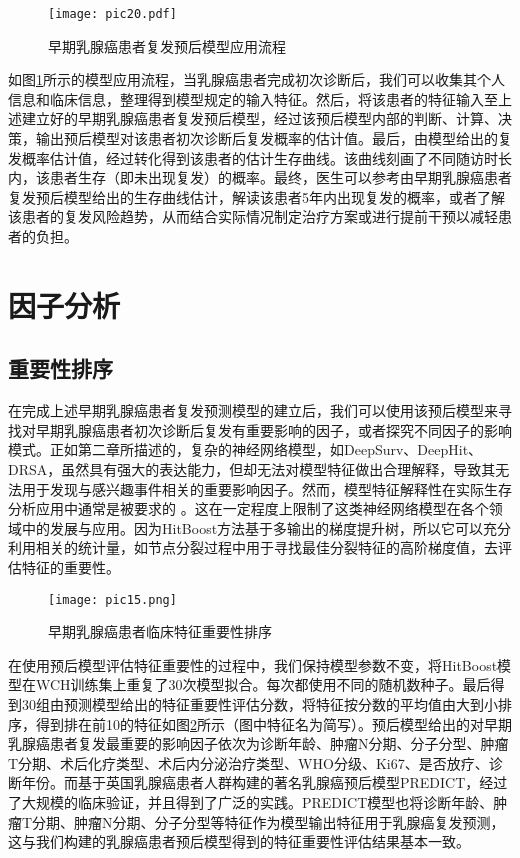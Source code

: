 \begin{figure}[H]
\texttt{[image: pic20.pdf]}
\caption{早期乳腺癌患者复发预后模型应用流程}
\label{pic20}
\end{figure}

如图\ref{pic20}所示的模型应用流程，当乳腺癌患者完成初次诊断后，我们可以收集其个人信息和临床信息，整理得到模型规定的输入特征。然后，将该患者的特征输入至上述建立好的早期乳腺癌患者复发预后模型，经过该预后模型内部的判断、计算、决策，输出预后模型对该患者初次诊断后复发概率的估计值。最后，由模型给出的复发概率估计值，经过转化得到该患者的估计生存曲线。该曲线刻画了不同随访时长内，该患者生存（即未出现复发）的概率。最终，医生可以参考由早期乳腺癌患者复发预后模型给出的生存曲线估计，解读该患者5年内出现复发的概率，或者了解该患者的复发风险趋势，从而结合实际情况制定治疗方案或进行提前干预以减轻患者的负担。

\section{因子分析}

\subsection{重要性排序}

在完成上述早期乳腺癌患者复发预测模型的建立后，我们可以使用该预后模型来寻找对早期乳腺癌患者初次诊断后复发有重要影响的因子，或者探究不同因子的影响模式。正如第二章所描述的，复杂的神经网络模型，如DeepSurv、DeepHit、DRSA，虽然具有强大的表达能力，但却无法对模型特征做出合理解释，导致其无法用于发现与感兴趣事件相关的重要影响因子。然而，模型特征解释性在实际生存分析应用中通常是被要求的 。这在一定程度上限制了这类神经网络模型在各个领域中的发展与应用。因为HitBoost方法基于多输出的梯度提升树，所以它可以充分利用相关的统计量，如节点分裂过程中用于寻找最佳分裂特征的高阶梯度值，去评估特征的重要性。

\begin{figure}[H]
\texttt{[image: pic15.png]}
\caption{早期乳腺癌患者临床特征重要性排序}
\label{pic15}
\end{figure}

在使用预后模型评估特征重要性的过程中，我们保持模型参数不变，将HitBoost模型在WCH训练集上重复了30次模型拟合。每次都使用不同的随机数种子。最后得到30组由预测模型给出的特征重要性评估分数，将特征按分数的平均值由大到小排序，得到排在前10的特征如图\ref{pic15}所示（图中特征名为简写）。预后模型给出的对早期乳腺癌患者复发最重要的影响因子依次为诊断年龄、肿瘤N分期、分子分型、肿瘤T分期、术后化疗类型、术后内分泌治疗类型、WHO分级、Ki67、是否放疗、诊断年份。而基于英国乳腺癌患者人群构建的著名乳腺癌预后模型PREDICT，经过了大规模的临床验证，并且得到了广泛的实践。PREDICT模型也将诊断年龄、肿瘤T分期、肿瘤N分期、分子分型等特征作为模型输出特征用于乳腺癌复发预测，这与我们构建的乳腺癌患者预后模型得到的特征重要性评估结果基本一致。

